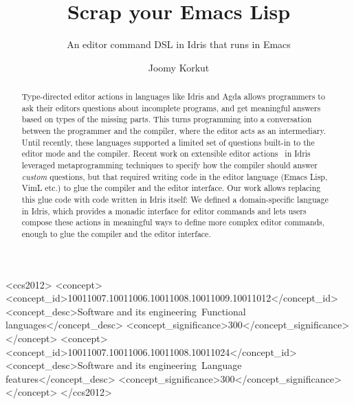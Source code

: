 \documentclass[sigplan, authordraft]{acmart}
\begin{document}
\title{Scrap your Emacs Lisp}
\subtitle{An editor command DSL in Idris that runs in Emacs}

\author{Joomy Korkut}

\renewcommand{\shortauthors}{Joomy Korkut}

\begin{abstract}
  Type-directed editor actions in languages like Idris and Agda allows programmers to
  ask their editors questions about incomplete programs, and get
  meaningful answers based on types of the missing parts.
  This turns programming into a conversation between the programmer and the
  compiler, where the editor acts as an intermediary.
  Until recently, these languages supported a limited set of questions built-in
  to the editor mode and the compiler.  Recent work on extensible editor
  actions~\cite{extensible} in Idris leveraged metaprogramming
  techniques to specify how the compiler should answer \emph{custom} questions,
  but that required writing code in the editor language (Emacs Lisp, VimL etc.) to
  glue the compiler and the editor interface. Our work allows replacing this
  glue code with code written in Idris itself: We defined a domain-specific
  language in Idris, which provides a monadic interface for editor commands and
  lets users compose these actions in meaningful ways to define more complex
  editor commands, enough to glue the compiler and the editor interface.
\end{abstract}

%
%
 \begin{CCSXML}
<ccs2012>
<concept>
<concept_id>10011007.10011006.10011008.10011009.10011012</concept_id>
<concept_desc>Software and its engineering~Functional languages</concept_desc>
<concept_significance>300</concept_significance>
</concept>
<concept>
<concept_id>10011007.10011006.10011008.10011024</concept_id>
<concept_desc>Software and its engineering~Language features</concept_desc>
<concept_significance>300</concept_significance>
</concept>
</ccs2012>
\end{CCSXML}

\end{document}
